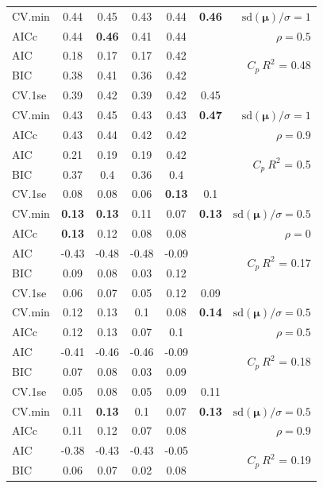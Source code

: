 \documentclass[12pt]{article}
\newcommand{\mr}[1]{\mathrm{#1}}
\newcommand{\bm}[1]{\mathbf{#1}}
\begin{document}
\begin{table}[p]
\begin{center}
\begin{tabular}{l*{5}{c}|r}
CV.min & 0.44 & 0.45 & 0.43 & 0.44 & {\bf 0.46} &  $\mr{sd}(\bm{\mu})/\sigma=1$ \\
AICc & 0.44 & {\bf 0.46} & 0.41 & 0.44 & & $\rho=0.5$ \\
AIC & 0.18 & 0.17 & 0.17 & 0.42 & & \multirow{2}{*}{$C_p ~ R^2$ = 0.48} \\
BIC & 0.38 & 0.41 & 0.36 & 0.42 & & \\
 \hline 
CV.1se & 0.39 & 0.42 & 0.39 & 0.42 & 0.45 &\\
CV.min & 0.43 & 0.45 & 0.43 & 0.43 & {\bf 0.47} &  $\mr{sd}(\bm{\mu})/\sigma=1$ \\
AICc & 0.43 & 0.44 & 0.42 & 0.42 & & $\rho=0.9$ \\
AIC & 0.21 & 0.19 & 0.19 & 0.42 & & \multirow{2}{*}{$C_p ~ R^2$ = 0.5} \\
BIC & 0.37 & 0.4 & 0.36 & 0.4 & & \\
 \hline 
CV.1se & 0.08 & 0.08 & 0.06 & {\bf 0.13} & 0.1 &\\
CV.min & {\bf 0.13} & {\bf 0.13} & 0.11 & 0.07 & {\bf 0.13} &  $\mr{sd}(\bm{\mu})/\sigma=0.5$ \\
AICc & {\bf 0.13} & 0.12 & 0.08 & 0.08 & & $\rho=0$ \\
AIC & -0.43 & -0.48 & -0.48 & -0.09 & & \multirow{2}{*}{$C_p ~ R^2$ = 0.17} \\
BIC & 0.09 & 0.08 & 0.03 & 0.12 & & \\
 \hline 
CV.1se & 0.06 & 0.07 & 0.05 & 0.12 & 0.09 &\\
CV.min & 0.12 & 0.13 & 0.1 & 0.08 & {\bf 0.14} &  $\mr{sd}(\bm{\mu})/\sigma=0.5$ \\
AICc & 0.12 & 0.13 & 0.07 & 0.1 & & $\rho=0.5$ \\
AIC & -0.41 & -0.46 & -0.46 & -0.09 & & \multirow{2}{*}{$C_p ~ R^2$ = 0.18} \\
BIC & 0.07 & 0.08 & 0.03 & 0.09 & & \\
 \hline 
CV.1se & 0.05 & 0.08 & 0.05 & 0.09 & 0.11 &\\
CV.min & 0.11 & {\bf 0.13} & 0.1 & 0.07 & {\bf 0.13} &  $\mr{sd}(\bm{\mu})/\sigma=0.5$ \\
AICc & 0.11 & 0.12 & 0.07 & 0.08 & & $\rho=0.9$ \\
AIC & -0.38 & -0.43 & -0.43 & -0.05 & & \multirow{2}{*}{$C_p ~ R^2$ = 0.19} \\
BIC & 0.06 & 0.07 & 0.02 & 0.08 & & \\
 \hline
\end{tabular}
\end{center}
\vspace{-1cm}
\end{table}
\end{document}

